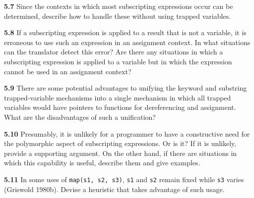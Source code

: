 \noindent\textbf{5.7} Since the contexts in which most subscripting
expressions occur can be determined, describe how to handle these
without using trapped variables.

\noindent\textbf{5.8} If a subscripting expression is applied to a
result that is not a variable, it is erroneous to use such an
expression in an assignment context. In what situations can the
translator detect this error? Are there any situations in which a
subscripting expression is applied to a variable but in which the
expression cannot be used in an assignment context?

\noindent\textbf{5.9} There are some potential advantages to unifying
the keyword and substring trapped-variable mechanisms into a single
mechanism in which all trapped variables would have pointers to
functions for dereferencing and assignment. What are the disadvantages
of such a unification?

\noindent\textbf{5.10} Presumably, it is unlikely for a programmer to
have a constructive need for the polymorphic aspect of subscripting
expressions. Or is it? If it is unlikely, provide a supporting
argument. On the other hand, if there are situations in which this
capability is useful, describe them and give examples.

\noindent\textbf{5.11} In some uses of \texttt{map(s1, s2, s3)}, \texttt{s1}
and \texttt{s2} remain fixed while \texttt{s3} varies (Griswold
1980b). Devise a heuristic that takes advantage of such usage.
